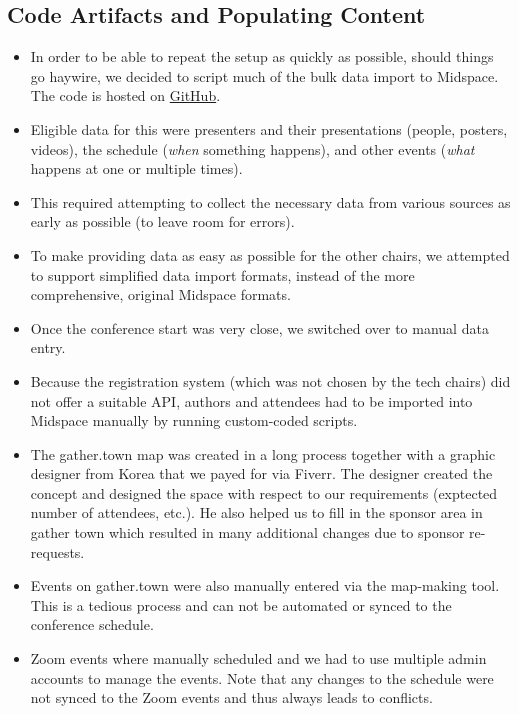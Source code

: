\documentclass[%
10pt,								%
titlepage,						%
]
{scrartcl}
\begin{document}
    \subsection{Code Artifacts and Populating Content}
        \begin{itemize}
            \item In order to be able to repeat the setup as quickly as possible, should things go haywire, we decided to script much of the bulk data import to Midspace. The code is hosted on \href{https://github.com/ismir/ismir-2021-utils}{GitHub}.
            \item Eligible data for this were presenters and their presentations (people, posters, videos), the schedule (\emph{when} something happens), and other events (\emph{what} happens at one or multiple times).
            \item This required attempting to collect the necessary data from various sources as early as possible (to leave room for errors).
            \item To make providing data as easy as possible for the other chairs, we attempted to support simplified data import formats, instead of the more comprehensive, original Midspace formats.
            \item Once the conference start was very close, we switched over to manual data entry.
            \item Because the registration system (which was not chosen by the tech chairs) did not offer a suitable API, authors and attendees had to be imported into Midspace manually by running custom-coded scripts.
            \item The gather.town map was created in a long process together with a graphic designer from Korea that we payed for via Fiverr. The designer created the concept and designed the space with respect to our requirements (exptected number of attendees, etc.). He also helped us to fill in the sponsor area in gather town which resulted in many additional changes due to sponsor re-requests.
            \item Events on gather.town were also manually entered via the map-making tool. This is a tedious process and can not be automated or synced to the conference schedule.
            \item Zoom events where manually scheduled and we had to use multiple admin accounts to manage the events. Note that any changes to the schedule were not synced to the Zoom events and thus always leads to conflicts.
        \end{itemize}
\end{document}
